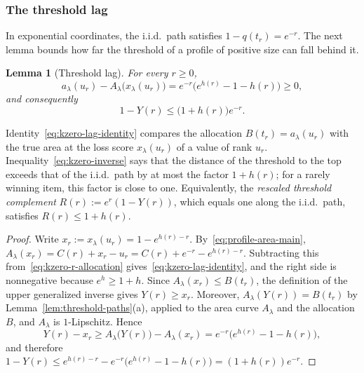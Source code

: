 \documentclass[11pt]{article}
\newtheorem{lemma}[theorem]{Lemma}
\theoremstyle{definition}
\theoremstyle{remark}
\begin{document}
\subsubsection{The threshold lag}\label{sec:kzero-lag}

In exponential coordinates, the i.i.d.\ path satisfies $1-q(t_r)=e^{-r}$.
The next lemma bounds how far the threshold of a profile of positive size can fall behind it.

\begin{lemma}[Threshold lag]\label{lem:kzero-inverse}
For every $r\ge0$,
\begin{equation}\label{eq:kzero-lag-identity}
 a_\lambda(u_r)-A_\lambda\bigl(x_\lambda(u_r)\bigr)
 =e^{-r}\bigl(e^{h(r)}-1-h(r)\bigr)\ge0,
\end{equation}
and consequently
\begin{equation}\label{eq:kzero-inverse}
 1-Y(r)\le\bigl(1+h(r)\bigr)e^{-r}.
\end{equation}
\end{lemma}

Identity~\eqref{eq:kzero-lag-identity} compares the allocation $B(t_r)=a_\lambda(u_r)$ with the true area at the loss score $x_\lambda(u_r)$ of a value of rank $u_r$.
Inequality~\eqref{eq:kzero-inverse} says that the distance of the threshold to the top exceeds that of the i.i.d.\ path by at most the factor $1+h(r)$; for a rarely winning item, this factor is close to one.
Equivalently, the \emph{rescaled threshold complement} $R(r):=e^r(1-Y(r))$, which equals one along the i.i.d.\ path, satisfies $R(r)\le1+h(r)$.

\begin{proof}
Write $x_r:=x_\lambda(u_r)=1-e^{h(r)-r}$.
By~\eqref{eq:profile-area-main}, $A_\lambda(x_r)=C(r)+x_r-u_r=C(r)+e^{-r}-e^{h(r)-r}$.
Subtracting this from~\eqref{eq:kzero-r-allocation} gives~\eqref{eq:kzero-lag-identity}, and the right side is nonnegative because $e^h\ge1+h$.
Since $A_\lambda(x_r)\le B(t_r)$, the definition of the upper generalized inverse gives $Y(r)\ge x_r$.
Moreover, $A_\lambda(Y(r))=B(t_r)$ by Lemma~\ref{lem:threshold-paths}(a), applied to the area curve $A_\lambda$ and the allocation $B$, and $A_\lambda$ is $1$-Lipschitz.
Hence
\[
 Y(r)-x_r\ge A_\lambda\bigl(Y(r)\bigr)-A_\lambda(x_r)=e^{-r}\bigl(e^{h(r)}-1-h(r)\bigr),
\]
and therefore $1-Y(r)\le e^{h(r)-r}-e^{-r}\bigl(e^{h(r)}-1-h(r)\bigr)=(1+h(r))e^{-r}$.
\end{proof}
\end{document}

